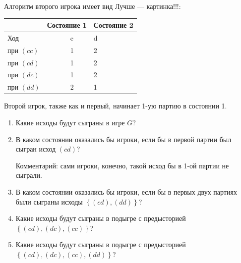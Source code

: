 \begin{problem}
Алгоритм второго игрока имеет вид {\red Лучше — картинка!!!}:


\begin{tabular} {|p{43.12pt}| p{19.60pt}| p{37.52pt}| p{19.60pt}| p{31.92pt}| } \hline
   &  \multicolumn{2}{|l|}{ Состояние 1 } &  \multicolumn{2}{|l|}{ Состояние 2 } \\ \hline
 \multicolumn{2}{|l|}{ Ход } &  \multicolumn{2}{|l|}{ c } &  d  \\ \hline
 \multicolumn{2}{|l|}{ при  $\left(cc\right)$  } &  \multicolumn{2}{|l|}{ 1 } &  2  \\ \hline
 \multicolumn{2}{|l|}{ при  $\left(cd\right)$  } &  \multicolumn{2}{|l|}{ 1 } &  2  \\ \hline
 \multicolumn{2}{|l|}{ при  $\left(dc\right)$  } &  \multicolumn{2}{|l|}{ 1 } &  2  \\ \hline
 \multicolumn{2}{|l|}{ при  $\left(dd\right)$  } &  \multicolumn{2}{|l|}{ 2 } &  1  \\ \hline
\end{tabular}

Второй игрок, также как и первый, начинает 1-ую партию в состоянии 1.
\begin{enumerate}
\item  Какие исходы будут сыграны в игре  $G$?\par
\item В каком состоянии оказались бы игроки, если бы в первой партии был сыгран исход  $\left(cd\right)$?\par
Комментарий: сами игроки, конечно, такой исход бы в 1-ой партии не сыграли.\par
\item  В каком состоянии оказались бы игроки, если бы в первых двух партиях были сыграны исходы  $\left\{\left(cd\right),\left(dd\right)\right\}$?\par
\item Какие исходы будут сыграны в подыгре с предысторией  $\left\{\left(cd\right),\left(dc\right),\left(cc\right)\right\}$?
\item Какие исходы будут сыграны в подыгре с предысторией  $\left\{\left(cd\right),\left(dc\right),\left(cc\right),\left(dd\right)\right\}$?
\end{enumerate}


\begin{sol}

\end{sol}
\end{problem}



